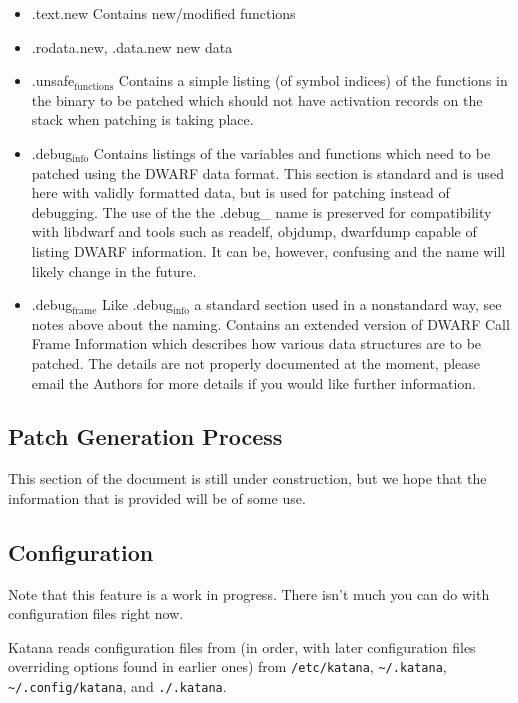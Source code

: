 \documentclass[11pt]{article}
\begin{document}
\begin{itemize}
\item .text.new
     Contains new/modified functions
\item .rodata.new, .data.new
     new data
\item .unsafe$_{\mathrm{functions}}$
     Contains a simple listing (of symbol indices) of the functions in
     the binary to be patched which should not have activation records
     on the stack when patching is taking place.
\item .debug$_{\mathrm{info}}$
     Contains listings of the variables and functions which need to be
     patched using the DWARF data format. This section is standard and
     is used here with validly formatted data, but is used for
     patching instead of debugging. The use of the the .debug\_{} name is
     preserved for compatibility with libdwarf and tools such as
     readelf, objdump, dwarfdump capable of listing DWARF
     information. It can be, however, confusing and the name will
     likely change in the future.
\item .debug$_{\mathrm{frame}}$
     Like .debug$_{\mathrm{info}}$ a standard section used in a nonstandard way,
     see notes above about the naming. Contains an extended version of
     DWARF Call Frame Information which describes how various data
     structures are to be patched. The details are not properly
     documented at the moment, please email the Authors for more
     details if you would like further information.
\end{itemize}
\subsection{Patch Generation Process}
\label{sec-3.7}

   This section of the document is still under construction, but we
   hope that the information that is provided will be of some use.


   
\subsection{Configuration}
\label{sec-3.8}

   Note that this feature is a work in progress. There isn't much you
   can do with configuration files right now.
   
   Katana reads configuration files from (in order, with later
   configuration files overriding options found in earlier ones) from
   \texttt{/etc/katana}, \texttt{\textasciitilde{}/.katana}, \texttt{\textasciitilde{}/.config/katana}, and \texttt{./.katana}.
\end{document}
